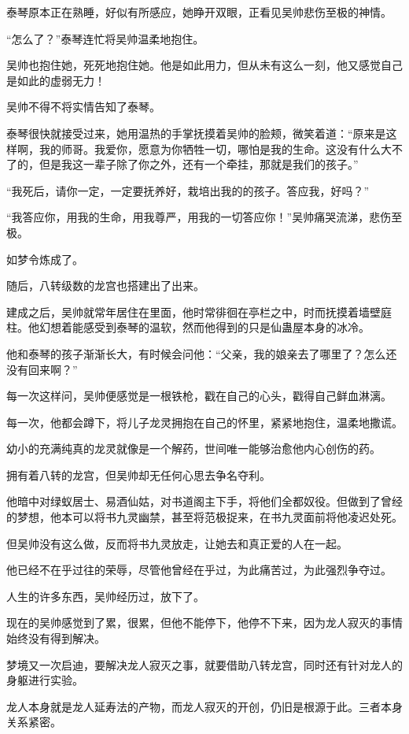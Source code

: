 \begin{this_body}
泰琴原本正在熟睡，好似有所感应，她睁开双眼，正看见吴帅悲伤至极的神情。

“怎么了？”泰琴连忙将吴帅温柔地抱住。

吴帅也抱住她，死死地抱住她。他是如此用力，但从未有这么一刻，他又感觉自己是如此的虚弱无力！

吴帅不得不将实情告知了泰琴。

泰琴很快就接受过来，她用温热的手掌抚摸着吴帅的脸颊，微笑着道：“原来是这样啊，我的师哥。我爱你，愿意为你牺牲一切，哪怕是我的生命。这没有什么大不了的，但是我这一辈子除了你之外，还有一个牵挂，那就是我们的孩子。”

“我死后，请你一定，一定要抚养好，栽培出我的的孩子。答应我，好吗？”

“我答应你，用我的生命，用我尊严，用我的一切答应你！”吴帅痛哭流涕，悲伤至极。

如梦令炼成了。

随后，八转级数的龙宫也搭建出了出来。

建成之后，吴帅就常年居住在里面，他时常徘徊在亭栏之中，时而抚摸着墙壁庭柱。他幻想着能感受到泰琴的温软，然而他得到的只是仙蛊屋本身的冰冷。

他和泰琴的孩子渐渐长大，有时候会问他：“父亲，我的娘亲去了哪里了？怎么还没有回来啊？”

每一次这样问，吴帅便感觉是一根铁枪，戳在自己的心头，戳得自己鲜血淋漓。

每一次，他都会蹲下，将儿子龙灵拥抱在自己的怀里，紧紧地抱住，温柔地撒谎。

幼小的充满纯真的龙灵就像是一个解药，世间唯一能够治愈他内心创伤的药。

拥有着八转的龙宫，但吴帅却无任何心思去争名夺利。

他暗中对绿蚁居士、易酒仙姑，对书道阁主下手，将他们全都奴役。但做到了曾经的梦想，他本可以将书九灵幽禁，甚至将范极捉来，在书九灵面前将他凌迟处死。

但吴帅没有这么做，反而将书九灵放走，让她去和真正爱的人在一起。

他已经不在乎过往的荣辱，尽管他曾经在乎过，为此痛苦过，为此强烈争夺过。

人生的许多东西，吴帅经历过，放下了。

现在的吴帅感觉到了累，很累，但他不能停下，他停不下来，因为龙人寂灭的事情始终没有得到解决。

梦境又一次启迪，要解决龙人寂灭之事，就要借助八转龙宫，同时还有针对龙人的身躯进行实验。

龙人本身就是龙人延寿法的产物，而龙人寂灭的开创，仍旧是根源于此。三者本身关系紧密。


\end{this_body}
